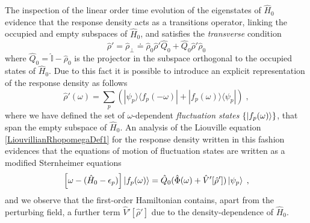 \documentclass[reprint,aps,prb]{revtex4-1}
\newcommand{\eps}{\epsilon}
\newcommand{\be}{\begin{equation}}
\newcommand{\ee}{\end{equation}}
\newcommand{\lb}{\label}
\newcommand{\op}[1]{\hat {#1}}
\newcommand{\ketbra}[2]{| #1 \rangle \langle #2 |}
\newcommand{\dmnot}{\op{\rho}_0}
\newcommand{\dm}{\op{\rho}}
\newcommand{\hnot}{\op{H}_0}
\newcommand{\identity}{\op{\mathbb I}}
\begin{document}

The inspection of the linear order time evolution of the eigenstates of $\hnot$ evidence that the response density acts as a transitions operator, linking the occupied and empty subspaces 
of $\hnot$, and satisfies the \emph{transverse} condition  
\be\lb{RhopTransverseDef1}
\dm' = \dm_{\perp} \doteq \dmnot\dm'\op Q_0 + \op Q_0\dm'\dmnot
\ee
where $\op Q_0=\identity-\dmnot$ is the projector in the subspace orthogonal to the occupied states of $\hnot$. Due to this fact it is possible to introduce an explicit representation of the 
response density as follows 
\be\lb{rhoPrimeFluctuationStateDef1}
\dm'(\omega) = \sum_p\left(\ketbra{\psi_p}{f_p(-\omega)} + \ketbra{f_p(\omega)}{\psi_p}\right) \;,
\ee
where we have defined the set of $\omega$-dependent \emph{fluctuation states} $\{\ket{f_p(\omega)}\}$, that span the empty subspace of $\hnot$. 
An analysis of the Liouville equation \eqref{LiouvillianRhopomegaDef1} for the response density written in this fashion evidences that the equations of motion of fluctuation states are 
written as a modified Sternheimer equations \cite{mahan1980}
\be\lb{fluctuationStateEqMotion1}
\left[\omega - (\hnot-\eps_p)\right]\ket{f_p(\omega)} = \op Q_0(\op\Phi(\omega)+\op V'[\dm'])\ket{\psi_p} \;,
\ee
and we observe that the first-order Hamiltonian contains, apart from the perturbing field, a further term $\op V'[\dm']$ due to the density-dependence of $\hnot$.
\end{document}
